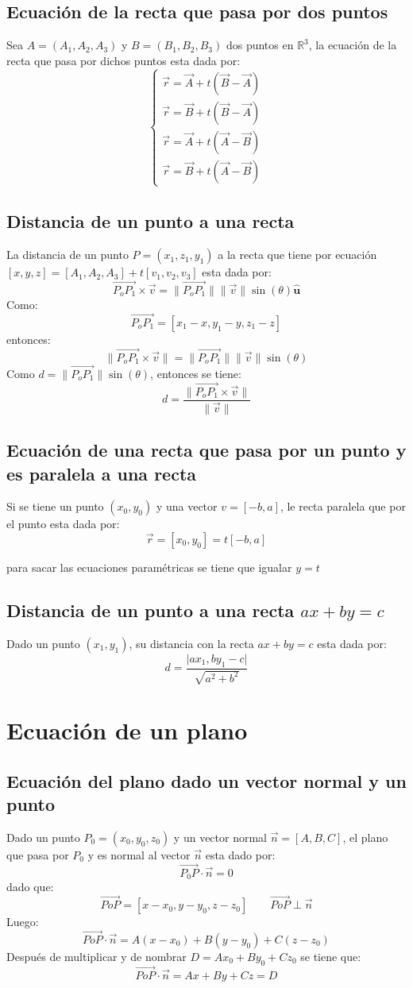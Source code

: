 \documentclass[a4paper]{article}
\newcommand{\abs}[1]{\lVert #1 \rVert}
\begin{document}
\subsection{Ecuación de la recta que pasa por dos puntos}
Sea $A=(A_1,A_2,A_3)$ y $B=(B_1,B_2,B_3)$ dos puntos en $\mathbb{R}^3$, la ecuación de la recta que pasa por dichos puntos esta dada por:
\[
\begin{cases}
\vec{r}=\vec{A}+t(\vec{B}-\vec{A})\\
\vec{r}=\vec{B}+t(\vec{B}-\vec{A})\\
\vec{r}=\vec{A}+t(\vec{A}-\vec{B})\\
\vec{r}=\vec{B}+t(\vec{A}-\vec{B})
\end{cases}
\]
\subsection{Distancia de un punto a una recta}
La distancia de un punto $P=(x_1,z_1,y_1)$ a la recta que tiene por ecuación $[x,y,z]=[A_1,A_2,A_3]+t[v_1,v_2,v_3]$ esta dada por:
\[\overrightarrow{P_oP_1}\times\vec{v}=\abs{\overrightarrow{P_oP_1}}\abs{\vec{v}}\sin(\theta)\mathbf{\hat{u}}\]
Como:
\[\overrightarrow{P_oP_1}=[x_1-x,y_1-y,z_1-z]\]
entonces:
\[\abs{\overrightarrow{P_oP_1}\times\vec{v}}=\abs{\overrightarrow{P_oP_1}}\abs{\vec{v}}\sin(\theta)\]
Como $d=\abs{\overrightarrow{P_oP_1}}\sin(\theta)$, entonces se tiene:
\[d=\frac{\abs{\overrightarrow{P_oP_1}\times\vec{v}}}{\abs{\vec{v}}}\]
\subsection{Ecuación de una recta que pasa por un punto y es paralela a una recta}
Si se tiene un punto $(x_0,y_0)$ y una vector $v=[-b,a]$, le recta paralela que por el
punto esta dada por:
\[\vec{r}=[x_0,y_0]=t[-b,a]\]

para sacar las ecuaciones paramétricas se tiene que igualar $y=t$ 
\subsection{Distancia de un punto a una recta $ax+by=c$}
Dado un punto $(x_1,y_1)$, su distancia con la recta $ax+by=c$ esta dada por:
\[d=\frac{\lvert ax_1,by_1-c\rvert}{\sqrt{a^2+b^2}}\]
\section{Ecuación de un plano}
\subsection{Ecuación del plano dado un vector normal y un punto}
Dado un punto $P_0=(x_0,y_0,z_0)$ y un vector normal $\vec{n}=[A,B,C]$, el plano que pasa por $P_0$ y es normal al vector $\vec{n}$ esta dado por:
\[\overrightarrow{P_0P}\cdot\vec{n}=0\]
dado que:
 \[\overrightarrow{PoP}=[x-x_0,y-y_0,z-z_0]\qquad\overrightarrow{PoP}\perp\vec{n}\]Luego:
 \[\overrightarrow{PoP}\cdot\vec{n}=A(x-x_0)+B(y-y_0)+C(z-z_0)\]
 Después de multiplicar y de nombrar $D=Ax_0+By_0+Cz_0$ se tiene que:
 \[\overrightarrow{PoP}\cdot\vec{n}=Ax+By+Cz=D\]
\end{document}
